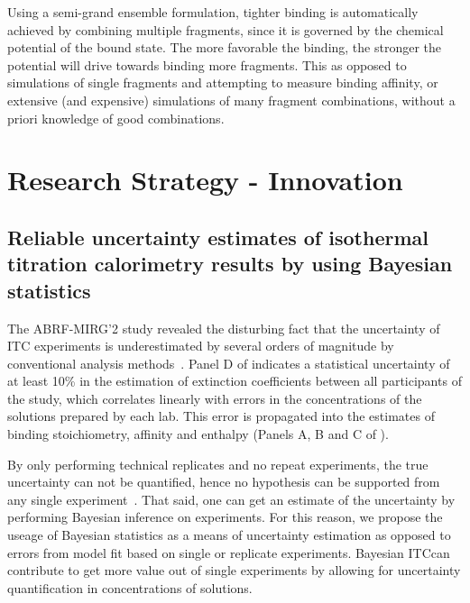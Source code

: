\documentclass[10pt,final]{article}
\newif\ifinstr
\newcommand{\instr}[1]{\ifdraft{\ifinstr {\color{cyan}\emph{#1}} \fi}{}}
\begin{document}
Using a semi-grand ensemble formulation, tighter binding is automatically achieved by combining multiple fragments, since it is governed by the chemical potential of the bound state. The more favorable the binding, the stronger the potential will drive towards binding more fragments. This as opposed to simulations of single fragments and attempting to measure binding affinity, or extensive (and expensive) simulations of many fragment combinations, without a priori knowledge of good combinations. 


\section*{Research Strategy - Innovation}
\instr{Explain how your proposal differs from what others have tried.}
\subsection*{Reliable uncertainty estimates of isothermal titration calorimetry results by using Bayesian statistics}
The ABRF-MIRG'2 study revealed the disturbing fact that the uncertainty of ITC experiments is underestimated by several orders of magnitude by conventional analysis methods~\cite{Myszka2003a}. Panel D of  indicates a statistical uncertainty of at least 10\% in the estimation of extinction coefficients between all participants of the study, which correlates linearly with errors in the concentrations of the solutions prepared by each lab. This error is propagated into the estimates of binding stoichiometry, affinity and enthalpy  (Panels A, B and C of ).

By only performing technical replicates  and no repeat experiments, the true uncertainty can not be quantified, hence no hypothesis can be supported from any single experiment~\cite{Vaux2012a}. That said, one can get an estimate of the uncertainty by performing Bayesian inference on experiments. For this reason, we propose the useage of Bayesian statistics as a means of uncertainty estimation as opposed to errors from model fit based on single or replicate experiments. Bayesian ITC\texttrademark can contribute to get more value out of single experiments by allowing for uncertainty quantification in concentrations of solutions. 
\end{document}
